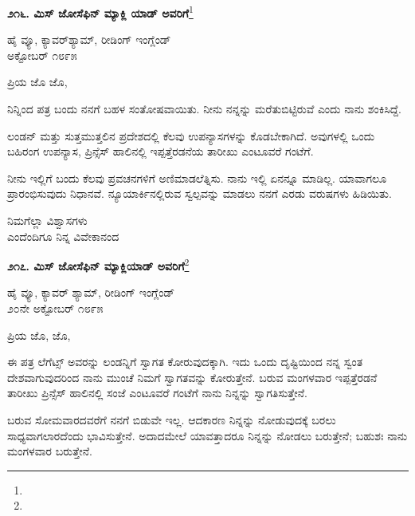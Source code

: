 \begin{center}
\textbf{೨೧೬. ಮಿಸ್ ಜೋಸೆಫಿನ್ ಮ್ಯಾಕ್ಲಿ ಯಾಡ್ ಅವರಿಗೆ}\footnote{}
\end{center}
\vspace{-0.3cm}

\begin{flushright}
ಹೈ ವ್ಯೂ, ಕ್ಯಾವರ್‌ಶ್ಯಾಮ್, ರೀಡಿಂಗ್ ಇಂಗ್ಲೆಂಡ್\\ಅಕ್ಟೋಬರ್ ೧೮೯೫
\end{flushright}

\noindent
ಪ್ರಿಯ ಜೊ ಜೊ,

ನಿನ್ನಿಂದ ಪತ್ರ ಬಂದು ನನಗೆ ಬಹಳ ಸಂತೋಷವಾಯಿತು. ನೀನು ನನ್ನನ್ನು ಮರೆತುಬಿಟ್ಟಿರುವೆ ಎಂದು ನಾನು ಶಂಕಿಸಿದ್ದೆ.

ಲಂಡನ್ ಮತ್ತು ಸುತ್ತಮುತ್ತಲಿನ ಪ್ರದೇಶದಲ್ಲಿ ಕೆಲವು ಉಪನ್ಯಾಸಗಳನ್ನು ಕೊಡಬೇಕಾಗಿದೆ. ಅವುಗಳಲ್ಲಿ ಒಂದು ಬಹಿರಂಗ ಉಪನ್ಯಾಸ, ಪ್ರಿನ್ಸೆಸ್ ಹಾಲಿನಲ್ಲಿ ಇಪ್ಪತ್ತೆರಡನೆಯ ತಾರೀಖು ಎಂಟೂವರೆ ಗಂಟೆಗೆ.

ನೀನು ಇಲ್ಲಿಗೆ ಬಂದು ಕೆಲವು ಪ್ರವಚನಗಳಿಗೆ ಅಣಿಮಾಡಲೆತ್ನಿಸು. ನಾನು ಇಲ್ಲಿ ಏನನ್ನೂ ಮಾಡಿಲ್ಲ. ಯಾವಾಗಲೂ ಪ್ರಾರಂಭಿಸುವುದು ನಿಧಾನವೆ. ನ್ಯೂಯಾರ್ಕಿನಲ್ಲಿರುವ ಸ್ವಲ್ಪವನ್ನು ಮಾಡಲು ನನಗೆ ಎರಡು ವರುಷಗಳು ಹಿಡಿಯಿತು.

\vspace{-0.5cm}

{\flushright
ನಿಮಗೆಲ್ಲಾ ವಿಶ್ವಾಸಗಳು\\ಎಂದೆಂದಿಗೂ ನಿನ್ನ ವಿವೇಕಾನಂದ\par}

\begin{center}
\textbf{೨೧೭. ಮಿಸ್ ಜೋಸೆಫಿನ್ ಮ್ಯಾಕ್ಲಿಯಾಡ್ ಅವರಿಗೆ}\footnote{}
\end{center}

\vspace{-0.5cm}

\begin{flushright}
ಹೈ ವ್ಯೂ, ಕ್ಯಾವರ್ ‌ಶ್ಯಾಮ್, ರೀಡಿಂಗ್ ಇಂಗ್ಲೆಂಡ್\\೨೦ನೇ ಅಕ್ಟೋಬರ್ ೧೮೯೫
\end{flushright}

\noindent
ಪ್ರಿಯ ಜೊ, ಜೊ,

ಈ ಪತ್ರ ಲೆಗೆಟ್ಸ್ ಅವರನ್ನು ಲಂಡನ್ನಿಗೆ ಸ್ವಾಗತ ಕೋರುವುದಕ್ಕಾಗಿ. ಇದು ಒಂದು ದೃಷ್ಟಿಯಿಂದ ನನ್ನ ಸ್ವಂತ ದೇಶವಾಗುವುದರಿಂದ ನಾನು ಮುಂಚೆ ನಿಮಗೆ ಸ್ವಾಗತವನ್ನು ಕೋರುತ್ತೇನೆ. ಬರುವ ಮಂಗಳವಾರ ಇಪ್ಪತ್ತೆರಡನೆ ತಾರೀಖು ಪ್ರಿನ್ಸೆಸ್ ಹಾಲಿನಲ್ಲಿ ಸಂಜೆ ಎಂಟೂವರೆ ಗಂಟೆಗೆ ನಾನು ನಿನ್ನನ್ನು ಸ್ವಾಗತಿಸುತ್ತೇನೆ.

ಬರುವ ಸೋಮವಾರದವರೆಗೆ ನನಗೆ ಬಿಡುವೇ ಇಲ್ಲ. ಆದಕಾರಣ ನಿನ್ನನ್ನು ನೋಡುವುದಕ್ಕೆ ಬರಲು ಸಾಧ್ಯವಾಗಲಾರದೆಂದು ಭಾವಿಸುತ್ತೇನೆ. ಅದಾದಮೇಲೆ ಯಾವತ್ತಾದರೂ ನಿನ್ನನ್ನು ನೋಡಲು ಬರುತ್ತೇನೆ; ಬಹುಶಃ ನಾನು ಮಂಗಳವಾರ ಬರುತ್ತೇನೆ.

